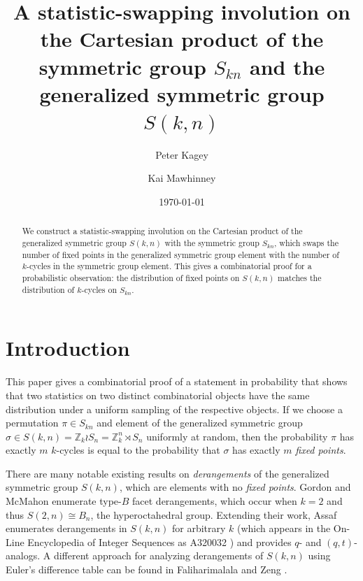 \documentclass{article}
\numberwithin{theorem}{section}
\theoremstyle{definition}
\begin{document}
\title{A statistic-swapping involution on the Cartesian product of the symmetric group \texorpdfstring{$S_{kn}$}{on kn letters} and the generalized symmetric group \texorpdfstring{$S(k,n)$}{S(k,n)}}
\author{Peter Kagey}
\author{Kai Mawhinney}
\date{\today}
\maketitle

\begin{abstract}
  We construct a statistic-swapping involution on the Cartesian product of the generalized symmetric group $S(k,n)$ with the symmetric group $S_{kn}$, which swaps the number of fixed points in the generalized symmetric group element with the number of $k$-cycles in the symmetric group element. This gives a combinatorial proof for a probabilistic observation: the distribution of fixed points on $S(k,n)$ matches the distribution of $k$-cycles on $S_{kn}$.
\end{abstract}

\section{Introduction}

This paper gives a combinatorial proof of a statement in probability that shows that two statistics on two distinct combinatorial objects have the same distribution under a uniform sampling of the respective objects. If we choose a permutation $\pi\in S_{kn}$ and element of the  generalized symmetric group $\sigma \in S(k,n) = \mathbb{Z}_k \wr S_n = \mathbb{Z}_k^n \rtimes S_n$ uniformly at random, then
the probability $\pi$ has exactly $m$ $k$-cycles is equal to the probability that $\sigma $ has exactly $m$ \emph{fixed points}.

There are many notable existing results on \emph{derangements} of the generalized symmetric group $S(k,n)$, which are elements with no \emph{fixed points}. Gordon and McMahon \cite{GordonMcMahon2010} enumerate type-$B$ facet derangements, which occur when $k=2$ and thus $S(2,n) \cong B_n$, the hyperoctahedral group. Extending their work, Assaf \cite{Assaf2010} enumerates derangements in $S(k,n)$ for arbitrary $k$ (which appears in the On-Line Encyclopedia of Integer Sequences as A320032 \cite{OEIS}) and provides $q$- and $(q,t)$-analogs. A different approach for analyzing derangements of $S(k,n)$ using Euler's difference table can be found in Faliharimalala and Zeng \cite{FaliharimalalaZeng2008}.
\end{document}
